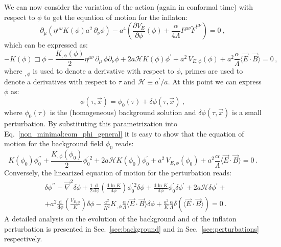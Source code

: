We can now consider the variation of the action (again in conformal time) with respect to $\phi$ to get the equation of motion for the inflaton:
\begin{equation}
	\partial_\mu \left( \eta^{\mu \nu} K(\phi) a^2 \, \partial_\nu \phi \right) -a^4 \left( \frac{\partial V_E}{\partial \phi}(\phi) + \frac{\alpha}{4 \Lambda} F^{\mu\nu}\tilde{F}^{\mu\nu}\right) = 0 \ ,
\end{equation}
which can be expressed as:
\begin{equation}
	\label{non_minimal:eom_phi_general}
	- K(\phi) \Box\phi -\frac{K_{,\phi}(\phi)}{2} \eta^{\mu\nu} \, \partial_\mu \, \phi \partial_\nu \phi+ 2a \mathcal{H} K(\phi)\phi^\prime + a^2 \, V_{E,\phi}(\phi) + a^2 \frac{\alpha}{\Lambda} \langle \vec{E}\cdot \vec{B}\rangle = 0  \, ,
\end{equation}
where ${}_{,\phi} $ is used to denote a derivative with respect to $\phi$, primes are used to denote a derivatives with respect to $\tau$ and $\mathcal{H}\equiv a^\prime/a$. At this point we can express $\phi$ as:
\begin{equation}
	\phi(\tau,\vec{x}) = \phi_0(\tau) + \delta \phi(\tau,\vec{x}) \ , 
\end{equation}
where $\phi_0(\tau)$ is the (homogeneous) background solution and $\delta \phi(\tau,\vec{x})$ is a small perturbation. By substituting this parametrization into Eq.~\eqref{non_minimal:eom_phi_general} it is easy to show that the equation of motion for the background field $\phi_0$ reads:
\begin{equation}
	\label{non_minimal:background_conformal}
	K(\phi_0) \phi_0^{\prime \prime} + \frac{K_{,\phi}(\phi_0)}{2} \phi_0^{\prime\, 2} + 2a \mathcal{H} K(\phi_0)\phi_0^\prime + a^2 \, V_{E,\phi}(\phi_0) + a^2 \frac{\alpha}{\Lambda} \langle \vec{E}\cdot \vec{B}\rangle = 0  \, .
\end{equation}
Conversely, the linearized equation of motion for the perturbation reads:
\begin{equation}
\begin{aligned}
	\label{non_minimal:perturbations}
	&\delta\phi^{\prime \prime} - \vec{\nabla}^2\delta\phi +\frac{1}{2}\frac{\textrm{d}}{\textrm{d} \phi} \left(\frac{\textrm{d} \ln K}{\textrm{d} \phi}\right) \phi_0^{\prime\, 2} \delta\phi + \frac{\textrm{d} \ln K}{\textrm{d} \phi} \phi_0^{\prime} \delta\phi^\prime + 2a \mathcal{H} \delta \phi^\prime +  \\ 
	&+ a^2 \frac{\textrm{d}}{\textrm{d} \phi} \left( \frac{V_{E,\phi}}{K}\right)\delta \phi  - \frac{a^2}{K^2} K_{,\phi} \frac{\alpha}{\Lambda} \langle \vec{E}\cdot \vec{B}\rangle \delta \phi + \frac{a^2}{K} \frac{\alpha}{\Lambda} \delta\left( \langle \vec{E}\cdot \vec{B}\rangle\right) = 0 \ .
\end{aligned}
\end{equation}
A detailed analysis on the evolution of the background and of the inflaton perturbation is presented in Sec.~\ref{sec:background} and in Sec.~\ref{sec:perturbations} respectively. 

